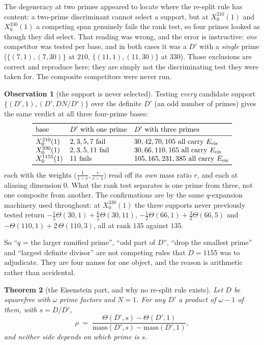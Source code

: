 \documentclass[11pt,reqno]{amsart}
\theoremstyle{plain}
\newtheorem{theorem}{Theorem}[section]
\theoremstyle{definition}
\newtheorem{observation}[theorem]{Observation}
\begin{document}
The degeneracy at two primes appeared to locate where the re-split rule has content: a
two-prime discriminant cannot select a support, but at $X_0^{210}(1)$ and $X_0^{330}(1)$
a competing span genuinely fails the rank test, so four primes looked as though they did
select. That reading was wrong, and the error is instructive: \emph{one} competitor was
tested per base, and in both cases it was a $D'$ with a \emph{single} prime
($\{(7,1),(7,30)\}$ at $210$, $\{(11,1),(11,30)\}$ at $330$). Those exclusions are correct
and reproduce here; they are simply not the discriminating test they were taken for. The
composite competitors were never run.

\begin{observation}[the support is never selected]\label{obs:nosel}
Testing \emph{every} candidate support $\{(D',1),(D',DN/D')\}$ over the definite $D'$ (an
odd number of primes) gives the same verdict at all three four-prime bases:
\[
\begin{array}{lll}
\toprule
\text{base} & D'\ \text{with one prime} & D'\ \text{with three primes}\\
\midrule
X_0^{210}(1) & 2,3,5,7\ \text{fail} & 30,42,70,105\ \text{all carry }E_{\mathrm{eis}}\\
X_0^{330}(1) & 2,3,5,11\ \text{fail} & 30,66,110,165\ \text{all carry }E_{\mathrm{eis}}\\
X_0^{1155}(1) & 11\ \text{fails} & 105,165,231,385\ \text{all carry }E_{\mathrm{eis}}\\
\bottomrule
\end{array}
\]
each with the weights $\bigl(\tfrac1{1-r},\tfrac{r}{r-1}\bigr)$ read off its
\emph{own} mass ratio $r$, and each at aliasing dimension $0$. What the rank test
separates is one prime from three, not one composite from another. The confirmations are
by the same $q$-expansion machinery used throughout: at $X_0^{330}(1)$ the three supports
never previously tested return
$-\tfrac15\Theta(30,1)+\tfrac65\Theta(30,11)$,
$-\tfrac12\Theta(66,1)+\tfrac32\Theta(66,5)$ and
$-\Theta(110,1)+2\,\Theta(110,3)$, all at rank $135$ against $135$.
\end{observation}

So ``$q$ = the larger ramified prime'', ``odd part of $D$'', ``drop the smallest prime''
and ``largest definite divisor'' are not competing rules that $D=1155$ was to adjudicate.
They are four names for one object, and the reason is arithmetic rather than accidental.

\begin{theorem}[the Eisenstein part, and why no re-split rule exists]\label{thm:noresplit}
Let $D$ be squarefree with $\omega$ prime factors and $N=1$. For any $D'$ a product of
$\omega-1$ of them, with $s=D/D'$,
\[
  \rho\;=\;\frac{\Theta(D',s)-\Theta(D',1)}{\mathrm{mass}(D',s)-\mathrm{mass}(D',1)},
\]
and neither side depends on which prime is $s$.
\end{theorem}
\end{document}
